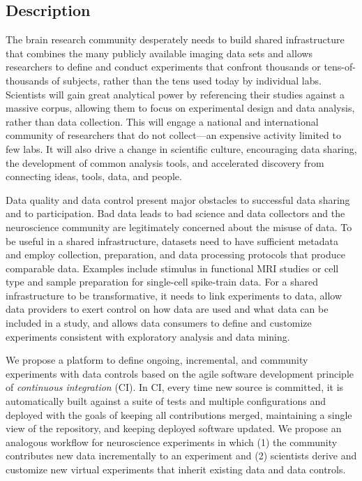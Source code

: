 \subsection{Description}

\noindent The brain research community desperately needs to build shared infrastructure that combines the many publicly available imaging data sets and allows researchers to define and conduct experiments that confront thousands or tens-of-thousands of subjects, rather than the tens used today by individual labs. Scientists will gain great analytical power by referencing their studies against a massive corpus, allowing them to focus on experimental design and data analysis, rather than data collection. This will engage a national and international community of researchers that do not collect---an expensive activity limited to few labs. It will also drive a change in scientific culture, encouraging data sharing, the development of common analysis tools, and accelerated discovery from connecting ideas, tools, data, and people.

Data quality and data control present major obstacles to successful data sharing and to participation. Bad data leads to bad science and data collectors and the neuroscience community are legitimately concerned about the misuse of data. To be useful in a shared infrastructure, datasets need to have sufficient metadata and employ collection, preparation, and data processing protocols that produce comparable data. Examples include stimulus in functional MRI studies or cell type and sample preparation for single-cell spike-train data. For a shared infrastructure to be transformative, it needs to link experiments to data, allow data providers to exert control on how data are used and what data can be included in a study, and allows data consumers to define and customize experiments consistent with exploratory analysis and data mining.

We propose a platform to define ongoing, incremental, and community experiments with data controls based on the agile software development principle of {\em continuous integration} (CI). In CI, every time new source is committed, it is automatically built against a suite of tests and multiple configurations and deployed with the goals of keeping all contributions merged, maintaining a single view of the repository, and keeping deployed software updated. We propose an analogous workflow for neuroscience experiments in which (1) the community contributes new data incrementally to an experiment and (2) scientists derive and customize new virtual experiments that inherit existing data and data controls. 

